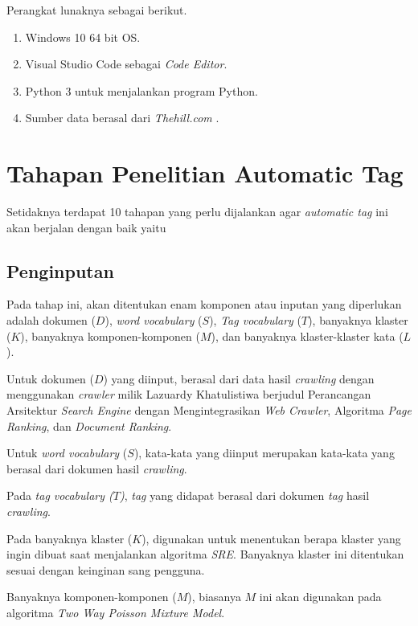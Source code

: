 Perangkat lunaknya sebagai berikut.

\begin{enumerate}
    \item Windows 10 64 bit OS.
    \item Visual Studio Code sebagai \textit{Code Editor}.
    \item Python 3 untuk menjalankan program Python.
    \item Sumber data berasal dari \textit{Thehill.com} .
\end{enumerate}

\section{Tahapan Penelitian Automatic Tag}

Setidaknya terdapat 10 tahapan yang perlu dijalankan agar \textit{automatic tag} ini akan berjalan dengan baik yaitu

\subsection{Penginputan}

Pada tahap ini, akan ditentukan enam komponen atau inputan yang diperlukan adalah dokumen ($D$), \textit{word vocabulary} ($S$), \textit{Tag vocabulary} ($T$), banyaknya klaster ($K$), banyaknya komponen-komponen ($M$), dan banyaknya klaster-klaster kata ($L$).

Untuk dokumen ($D$) yang diinput, berasal dari data hasil \textit{crawling} dengan menggunakan \textit{crawler} milik Lazuardy Khatulistiwa berjudul Perancangan Arsitektur \textit{Search Engine} dengan Mengintegrasikan \textit{Web Crawler}, Algoritma \textit{Page Ranking}, dan \textit{Document Ranking}.

Untuk \textit{word vocabulary} ($S$), kata-kata yang diinput merupakan kata-kata yang berasal dari dokumen hasil \textit{crawling}.

Pada \textit{tag vocabulary ($T$)}, \textit{tag} yang didapat berasal dari dokumen \textit{tag} hasil \textit{crawling}. 

Pada banyaknya klaster ($K$), digunakan untuk menentukan berapa klaster yang ingin dibuat saat menjalankan algoritma \textit{SRE}. Banyaknya klaster ini ditentukan sesuai dengan keinginan sang pengguna.

Banyaknya komponen-komponen ($M$), biasanya $M$ ini akan digunakan pada algoritma \textit{Two Way Poisson Mixture Model}.


